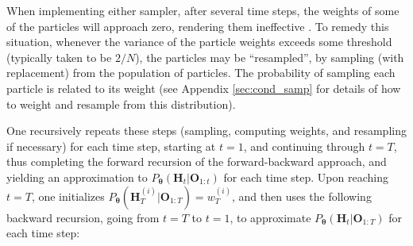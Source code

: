 \documentclass[12pt]{article}
\providecommand{\ve}[1]{\boldsymbol{#1}}
\providecommand{\ve}[1]{\boldsymbol{#1}}
\newcommand{\thetn}{\ve{\theta}}
\newcommand{\p}{P_{\thetn}}
\begin{document}
%

When implementing either sampler, after several time steps, the weights of some of the particles will approach zero, rendering them ineffective \cite{DoucetGordon01}. To remedy this situation, whenever the variance of the particle weights exceeds some threshold (typically taken to be $2/N$), the particles may be ``resampled'', by sampling (with replacement) from the population of particles.  The probability of sampling each particle is related to its weight \cite{DoucMoulines05} 
(see Appendix \ref{sec:cond_samp} for details of how to weight and resample from this distribution).

One recursively repeats these steps (sampling, computing weights, and resampling if necessary) for each time step, starting at $t=1$, and continuing through $t=T$, thus completing the forward recursion of the forward-backward approach, and yielding an approximation to $\p(\ve{H}_t |  \ve{O}_{1:t})$ for each time step.  Upon reaching $t=T$, one initializes $\p(\ve{H}_T^{(i)}|\ve{O}_{1:T})=w_T^{(i)}$, and then uses the following backward recursion, going from $t=T$ to $t=1$, to approximate $\p(\ve{H}_t | \ve{O}_{1:T})$ for each time step:
 
\end{document}
